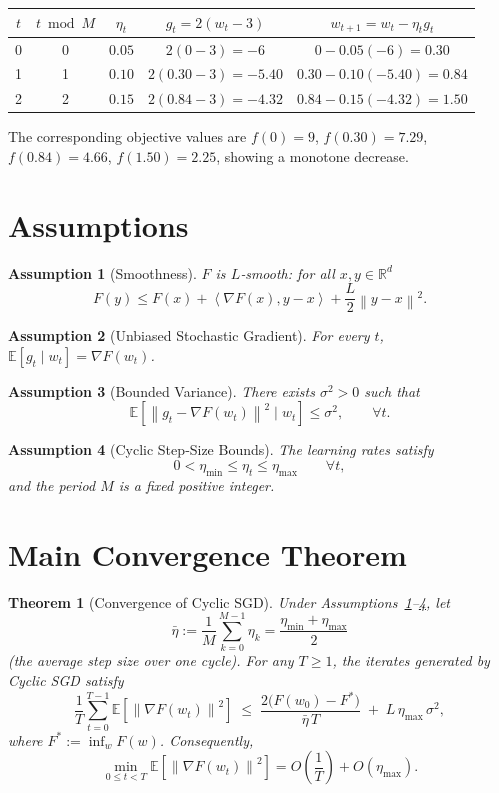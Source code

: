 \documentclass{article}
\newtheorem{theorem}{Theorem}
\newtheorem{assumption}{Assumption}
\newcommand{\E}{\mathbb{E}}
\newcommand{\R}{\mathbb{R}}
\newcommand{\norm}[1]{\left\|#1\right\|}
\newcommand{\inner}[2]{\left\langle #1,#2\right\rangle}
\begin{document}
\begin{center}
\begin{tabular}{c|c|c|c|c}
$t$ & $t\bmod M$ & $\eta_{t}$ & $g_{t}=2(w_{t}-3)$ & $w_{t+1}=w_{t}-\eta_{t}g_{t}$\\\hline
0 & 0 & $0.05$ & $2(0-3)=-6$ & $0-0.05(-6)=0.30$\\
1 & 1 & $0.10$ & $2(0.30-3)=-5.40$ & $0.30-0.10(-5.40)=0.84$\\
2 & 2 & $0.15$ & $2(0.84-3)=-4.32$ & $0.84-0.15(-4.32)=1.50$\\
\end{tabular}
\end{center}
The corresponding objective values are $f(0)=9$, $f(0.30)=7.29$, $f(0.84)=4.66$, $f(1.50)=2.25$, showing a monotone decrease.

\newpage
\section*{Assumptions}
\begin{assumption}[Smoothness]\label{as:smooth}
$F$ is $L$‑smooth: for all $x,y\in\R^{d}$
\[
F(y)\le F(x)+\inner{\nabla F(x)}{y-x}+\frac{L}{2}\norm{y-x}^{2}.
\]
\end{assumption}
\begin{assumption}[Unbiased Stochastic Gradient]\label{as:unbiased}
For every $t$, $\E[g_{t}\mid w_{t}]=\nabla F(w_{t})$.
\end{assumption}
\begin{assumption}[Bounded Variance]\label{as:variance}
There exists $\sigma^{2}>0$ such that
\[
\E\!\left[\norm{g_{t}-\nabla F(w_{t})}^{2}\mid w_{t}\right]\le\sigma^{2},\qquad\forall t.
\]
\end{assumption}
\begin{assumption}[Cyclic Step‑Size Bounds]\label{as:step}
The learning rates satisfy
\[
0<\eta_{\min}\le\eta_{t}\le\eta_{\max}\qquad\forall t,
\]
and the period $M$ is a fixed positive integer.
\end{assumption}

\section*{Main Convergence Theorem}
\begin{theorem}[Convergence of Cyclic SGD]\label{thm:main}
Under Assumptions~\ref{as:smooth}–\ref{as:step}, let
\[
\bar{\eta}:=\frac{1}{M}\sum_{k=0}^{M-1}\eta_{k}
          =\frac{\eta_{\min}+\eta_{\max}}{2}
\]
(the average step size over one cycle).  
For any $T\ge1$, the iterates generated by Cyclic SGD satisfy
\[
\frac{1}{T}\sum_{t=0}^{T-1}\E\!\left[\norm{\nabla F(w_{t})}^{2}\right]
\;\le\;
\frac{2\big(F(w_{0})-F^{*}\big)}{\bar{\eta}\,T}
\;+\;
L\,\eta_{\max}\,\sigma^{2},
\tag{1}
\]
where $F^{*}:=\inf_{w}F(w)$. Consequently,
\[
\min_{0\le t<T}\E\!\left[\norm{\nabla F(w_{t})}^{2}\right]
=O\!\left(\frac{1}{T}\right)+O\!\left(\eta_{\max}\right).
\]
\end{theorem}
\end{document}
